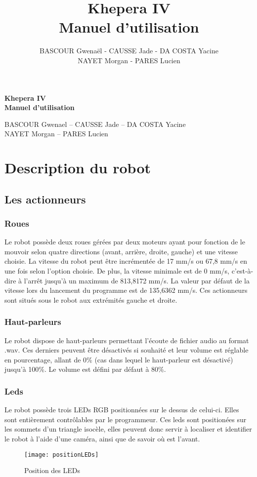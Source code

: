\documentclass[11pt]{article} %
\title{\huge\bfseries Khepera IV \\ Manuel d'utilisation	}
\author{BASCOUR Gwenaël - CAUSSE Jade - DA COSTA Yacine \\ NAYET Morgan - PARES Lucien}
\date{} %
\begin{document}
\begin{titlepage}
	\centering
	\vspace*{\fill}
	
	\vspace*{0.5cm}
	
	\huge\bfseries
	Khepera IV \\ Manuel d'utilisation
	
	\vspace*{0.5cm}
	
	\large BASCOUR Gwenael -- CAUSSE Jade -- DA COSTA Yacine \\ NAYET Morgan -- PARES Lucien
	
	\vspace*{\fill}
\end{titlepage}
\pagebreak
\tableofcontents
\pagebreak
\section{Description du robot}
\subsection{Les actionneurs}
\subsubsection{Roues}
Le robot possède deux roues gérées par deux moteurs ayant pour fonction de le mouvoir selon quatre directions (avant, arrière, droite, gauche) et une vitesse choisie. La vitesse du robot peut être incrémentée de 17 mm/s ou 67,8 mm/s en une fois selon l’option choisie. De plus, la vitesse minimale est de 0 mm/s, c’est-à-dire à l’arrêt jusqu’à un maximum de 813,8172 mm/s. La valeur par défaut de la vitesse lors du lancement du programme est de 135,6362 mm/s. Ces actionneurs sont situés sous le robot aux extrémités gauche et droite.
\subsubsection{Haut-parleurs}
Le robot dispose de haut-parleurs permettant l’écoute de fichier audio au format .wav. Ces derniers peuvent être désactivés si souhaité et leur volume est réglable en pourcentage, allant de 0\% (cas dans lequel le haut-parleur est désactivé) jusqu’à 100\%. Le volume est défini par défaut à 80\%.
\subsubsection{Leds}
Le robot possède trois LEDs RGB positionnées sur le dessus de celui-ci. Elles sont entièrement contrôlables par le programmeur. Ces leds sont positionées sur les sommets d'un triangle isocèle, elles peuvent donc servir à localiser et identifier le robot à l'aide d'une caméra, ainsi que de savoir où est l'avant. 
\begin{figure}[H]
	\centering
	\caption{Position des LEDs}
	\texttt{[image: positionLEDs]}
\end{figure}
\end{document}
